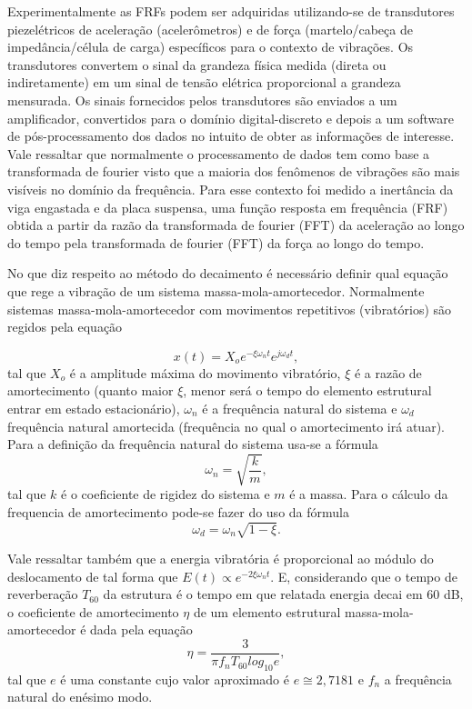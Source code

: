 Experimentalmente as FRFs podem ser adquiridas utilizando-se de transdutores piezelétricos de aceleração (acelerômetros) e de força (martelo/cabeça de impedância/célula de carga) específicos para o contexto de vibrações. Os transdutores convertem o sinal da grandeza física medida (direta ou indiretamente) em um sinal de tensão elétrica proporcional a grandeza mensurada. Os sinais fornecidos pelos transdutores são enviados a um amplificador, convertidos para o domínio digital-discreto e depois a um software de pós-processamento dos dados no intuito de obter as informações de interesse. Vale ressaltar que normalmente o processamento de dados tem como base a transformada de fourier visto que a maioria dos fenômenos de vibrações são mais visíveis no domínio da frequência. Para esse contexto foi medido a inertância da viga engastada e da placa suspensa, uma função resposta em frequência (FRF) obtida a partir da razão da transformada de fourier (FFT) da aceleração ao longo do tempo pela transformada de fourier (FFT) da força ao longo do tempo.

No que diz respeito ao método do decaimento é necessário definir qual equação que rege a vibração de um sistema massa-mola-amortecedor. Normalmente sistemas massa-mola-amortecedor com movimentos repetitivos (vibratórios) são regidos pela equação

\begin{equation}  
	x(t) = X_{o}e^{-\xi\omega_{n}t}e^{j\omega_{d}t},
\end{equation}
tal que $X_{o}$ é a amplitude máxima do movimento vibratório, $\xi$ é a razão de amortecimento (quanto maior $\xi$, menor será o tempo do elemento estrutural entrar em estado estacionário), $\omega_{n}$ é a frequência natural do sistema e $\omega_{d}$ frequência natural amortecida (frequência no qual o amortecimento irá atuar). Para a definição da frequência natural do sistema usa-se a fórmula 
\begin{equation}
	\omega_{n} = \sqrt{\frac{k}{m}},
\end{equation}
tal que $k$ é o coeficiente de rigidez do sistema e $m$ é a massa. Para o cálculo da frequencia de amortecimento pode-se fazer do uso da fórmula 
\begin{equation}
	\omega_{d} = \omega_{n}\sqrt{1 - \xi}.	
\end{equation}

Vale ressaltar também que a energia vibratória é proporcional ao módulo do deslocamento de tal forma que $E(t) \propto e^{-2\xi\omega_{n}t}$. E, considerando que o tempo de reverberação $T_{60}$ da estrutura é o tempo em que relatada energia decai em 60 dB, o coeficiente de amortecimento $\eta$ de um elemento estrutural massa-mola-amortecedor é dada pela equação 
\begin{equation}
	\eta = \frac{3}{\pi f_{n}T_{60}log_{10}e},
\end{equation}
tal que $e$ é uma constante cujo valor aproximado é $e \cong 2,7181$ e $f_{n}$ a frequência natural do enésimo modo.

